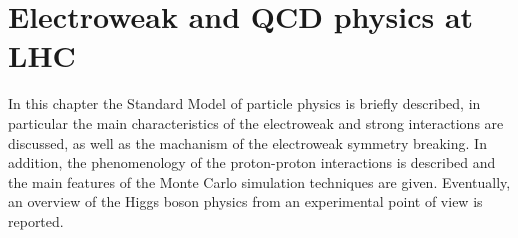 \chapter{Electroweak and QCD physics at LHC}\label{chap1}
\thispagestyle{empty}

In this chapter the Standard Model of particle physics is briefly described, in particular the main characteristics of the electroweak and strong interactions are discussed, as well as the machanism of the electroweak symmetry breaking.
In addition, the phenomenology of the proton-proton interactions is described and the main features of the Monte Carlo simulation techniques are given.
Eventually, an overview of the Higgs boson physics from an experimental point of view is reported.








